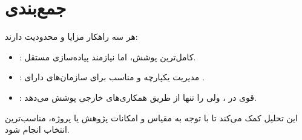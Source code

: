 \section{جمع‌بندی}
هر سه راهکار مزایا و محدودیت دارند:
\begin{itemize}
  \renewcommand{\labelitemi}{\lr{$\bullet$}}
  \item {}: کامل‌ترین پوشش، اما نیازمند پیاده‌سازی مستقل.
  \item {}: مدیریت یکپارچه و مناسب برای سازمان‌های دارای .
  \item {}: قوی در ، ولی  را تنها از طریق همکاری‌های خارجی پوشش می‌دهد.
\end{itemize}
این تحلیل کمک می‌کند تا با توجه به مقیاس و امکانات پژوهش یا پروژه، مناسب‌ترین انتخاب انجام شود. 